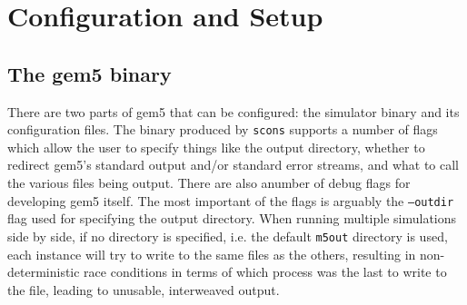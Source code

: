 \section{Configuration and Setup}
    \subsection{The gem5 binary}
    There are two parts of gem5 that can be configured: the simulator binary 
    and its configuration files. The binary produced by \texttt{scons} supports 
    a number of flags which allow the user to specify things like the output 
    directory, whether to redirect gem5's standard output and/or standard error 
    streams, and what to call the various files being output. There are also 
    anumber of debug flags for developing gem5 itself. The most important of 
    the flags is arguably the \texttt{--outdir} flag used for specifying the 
    output directory. When running multiple simulations side by side, if no 
    directory is specified, i.e. the default \texttt{m5out} directory is used, 
    each instance will try to write to the same files as the others, resulting 
    in non-deterministic race conditions in terms of which process was the last 
    to write to the file, leading to unusable, interweaved output.

